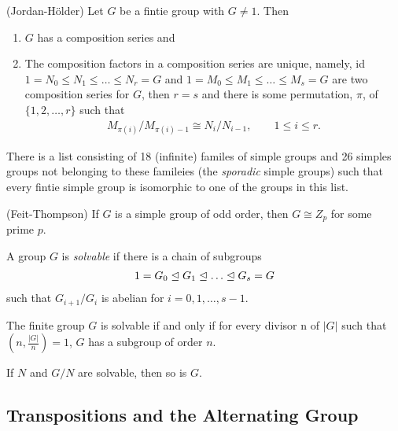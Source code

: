 \documentclass[../main]{subfiles}
\begin{document}
  
  \begin{thm}
   (Jordan-H\"{o}lder) Let $G$ be a fintie group with $G \neq 1$. Then 
   \begin{enumerate}
    \item $G$ has a composition series and 
    \item The composition factors in a composition series are unique, namely, id $1=N_0\leq N_1 \leq \ldots \leq N_r = G$ and $1 = M_0 \leq M_1 \leq \ldots \leq M_s = G$ are two composition series for $G$, then $r=s$ and there is some permutation, $\pi$, of $\{1,2,\ldots,r\}$ such that 
    \begin{align*}
     M_{\pi(i)}/M_{\pi(i)-1} \cong N_i/N_{i-1}, \qquad 1\leq i\leq r.
    \end{align*}
   \end{enumerate}
  \end{thm}
  
  
  \begin{thm*}
   There is a list consisting of 18 (infinite) familes of simple groups and 26 simples groups not belonging to these famileies (the \textit{sporadic} simple groups) such that every fintie simple group is isomorphic to one of the groups in this list.
  \end{thm*}
  
  
  \begin{thm*}
   (Feit-Thompson) If $G$ is a simple group of odd order, then $G \cong Z_p$ for some prime $p$.
  \end{thm*}
  
  
  \begin{dfn}
   A group $G$ is \textit{solvable} if there is a chain of subgroups
   \begin{align*}
    1=G_0 \trianglelefteq G_1 \trianglelefteq \ldots \trianglelefteq G_s = G 
   \end{align*}
   such that $G_{i+1}/G_i$ is abelian for $i = 0,1,\ldots , s-1$.
  \end{dfn}
  
  
  \begin{thm*}
   The finite group $G$ is solvable if and only if for every divisor n of $|G|$ such that $(n, \frac{|G|}{n})=1$, $G$ has a subgroup of order $n$.
  \end{thm*}
  
  
  \begin{nt}
   If $N$ and $G/N$ are solvable, then so is $G$.
  \end{nt}
  
  
  \subsection{Transpositions and the Alternating Group}
  
\end{document}
